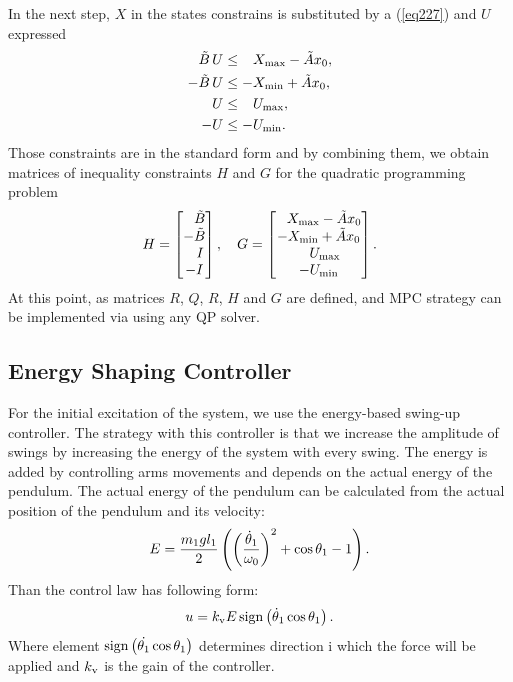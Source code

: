 In the next step, $X$ in the states constrains is substituted by a (\ref{eq227}) and $U$ expressed
\begin{subequations}
	\begin{align}
	\tilde{B}\,U &\leq \ \; \,X _{\text{max}} - \tilde{A}x_0,\\
	-\tilde{B}\,U &\leq -X _{\text{min}} + \tilde{A}x_0,\\
	U &\leq \ \; \,U _{\text{max}},\\
	-U &\leq -U _{\text{min}}.
	\end{align}
\end{subequations}
Those constraints are in the standard form and by combining them, we obtain matrices of inequality constraints $H$ and $G$ for the quadratic programming problem
\begin{equation}
	H = \begin{bmatrix}
	\ \; \,\tilde{B}\\
	-\tilde{B}\\
	\ \ \, I\\
	-I\\
	\end{bmatrix}, \quad
	G = \begin{bmatrix}
	\ \; \,X _{\text{max}} - \tilde{A}x_0\\
	-X _{\text{min}} + \tilde{A}x_0\\
	\ \ \:U _{\text{max}}\\
	-U _{\text{min}}
	\end{bmatrix}.
\end{equation}
At this point, as matrices $R$, $Q$, $R$, $H$ and $G$ are defined, and MPC strategy can be implemented via using any QP solver.
\subsection{Energy Shaping Controller}\label{energyshapingsection}
For the initial excitation of the system, we use the energy-based swing-up controller. The strategy with this controller is that we increase the amplitude of swings by increasing the energy of the system with every swing. The energy is added by controlling arms movements and depends on the actual energy of the pendulum. The actual energy of the pendulum can be calculated from the actual position of the pendulum and its velocity: 
\begin{equation}
E = \frac{m_1gl_1}{2}\left( \left( \frac{\dot{\theta}_1}{\omega_0} \right)^2+\cos\theta_1 - 1 \right).
\end{equation}
Than the control law has following form:
\begin{equation}\label{energy-shaping}
	u = k _{\text{v}}E\,\mathrm{sign}\left( \dot{\theta}_1\cos\theta_1 \right).
\end{equation}
Where element $\mathrm{sign}\left( \dot{\theta_1}\cos\theta_1 \right)$ determines direction i which the force will be applied and $k _{\text{v}}$ is the gain of the controller.
\newpage
